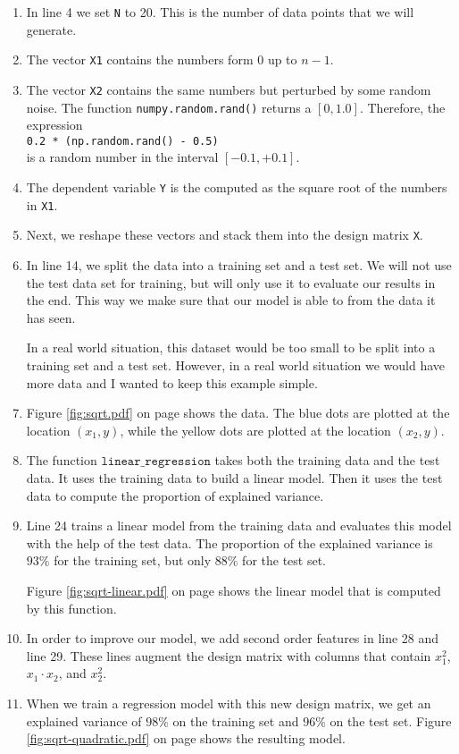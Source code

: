 \begin{enumerate}
\item In line 4 we set \texttt{N} to 20.  This is the number of data points that we will generate.
\item The vector \texttt{X1} contains the numbers form 0 up to $n-1$.
\item The vector \texttt{X2} contains the same numbers but perturbed by some random noise.
      The function \texttt{numpy.random.rand()} returns a $[0, 1.0]$.  Therefore, the expression
      \\[0.2cm]
      \hspace*{1.3cm}
      \texttt{0.2 * (np.random.rand() - 0.5)}
      \\[0.2cm]
      is a random number in the interval $[-0.1, +0.1]$.
\item The dependent variable \texttt{Y} is the computed as the square root of the numbers in \texttt{X1}.
\item Next, we reshape these vectors and stack them into the design matrix \texttt{X}.
\item In line 14, we split the data into a training set and a test set.  We will not use the test data set for
      training, but will only use it to evaluate our results in the end.  This way we make sure that our model
      is able to  from the data it has seen.

      In a real world situation, this dataset would be too small to be split into a training set and a test set.
      However, in a real world situation we would have more data and I wanted to keep this example simple.
\item Figure \ref{fig:sqrt.pdf} on page \pageref{fig:sqrt.pdf} shows the data.  The blue dots are plotted at the
      location $(x_1, y)$, while the yellow dots are plotted at the location $(x_2, y)$.   
\item The function $\mathtt{linear\_regression}$ takes both the training data and the test data.
      It uses the training data to build a linear model.  Then it uses the test data to compute the proportion
      of explained variance.
    \item Line 24 trains a linear model from the training data and evaluates this model with the help of the test
      data.  The proportion of the explained variance is $93\%$ for the training set, but only $88\%$ for the
      test set.
  
      Figure \ref{fig:sqrt-linear.pdf} on page \pageref{fig:sqrt-linear.pdf} shows the linear model that is
      computed by this function.
\item In order to improve our model, we add second order features in line 28 and line 29.  These lines augment
      the design matrix with columns that contain $x_1^2$, $x_1 \cdot x_2$, and $x_2^2$.
\item When we train a regression model with this new design matrix, we get an explained variance of $98\%$ 
      on the training set and $96\%$ on the test set.
      Figure \ref{fig:sqrt-quadratic.pdf} on page \pageref{fig:sqrt-quadratic.pdf} shows the resulting model.
\end{enumerate}

